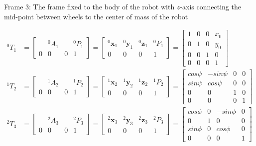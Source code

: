 \documentclass[a4paper,10pt]{article}
\begin{document}
Frame $3$: The frame fixed to the body of the robot with $z$-axis connecting the mid-point between wheels to the center of mass of the robot

\begin{align}
 {}^0T_1 &= \left[\begin{matrix}  & {}^0A_1 & & {}^0P_1 \\ 0 & 0 & 0 & 1\end{matrix}\right]
 = \left[\begin{matrix} {}^0\mathbf{x}_1 & {}^0\mathbf{y}_1 & {}^0\mathbf{z}_1 & {}^0P_1 \\ 0 & 0 & 0 & 1\end{matrix}\right] 
 = \left[\begin{matrix} 1 & 0 & 0 & x_0 \\ 0 & 1 & 0 & y_0 \\ 0 & 0 & 1 & 0 \\ 0 & 0 & 0 & 1\end{matrix}\right] \\
 {}^1T_2 &= \left[\begin{matrix}  & {}^1A_2 & & {}^1P_2 \\ 0 & 0 & 0 & 1\end{matrix}\right]
 = \left[\begin{matrix} {}^1\mathbf{x}_2 & {}^1\mathbf{y}_2 & {}^1\mathbf{z}_2 & {}^1P_2 \\ 0 & 0 & 0 & 1\end{matrix}\right] 
 = \left[\begin{matrix} cos\psi & -sin\psi & 0 & 0 \\ sin\psi & cos\psi & 0 & 0 \\ 0 & 0 & 1 & 0 \\ 0 & 0 & 0 & 1\end{matrix}\right] \\
 {}^2T_3 &= \left[\begin{matrix}  & {}^2A_3 & & {}^2P_3 \\ 0 & 0 & 0 & 1\end{matrix}\right]
 = \left[\begin{matrix} {}^2\mathbf{x}_3 & {}^2\mathbf{y}_3 & {}^2\mathbf{z}_3 & {}^2P_3 \\ 0 & 0 & 0 & 1\end{matrix}\right] 
 = \left[\begin{matrix} cos\phi & 0 & -sin\phi & 0 \\ 0 & 1 & 0 & 0 \\ sin\phi & 0 & cos\phi & 0 \\ 0 & 0 & 0 & 1\end{matrix}\right] \\

\end{align}
\end{document}
